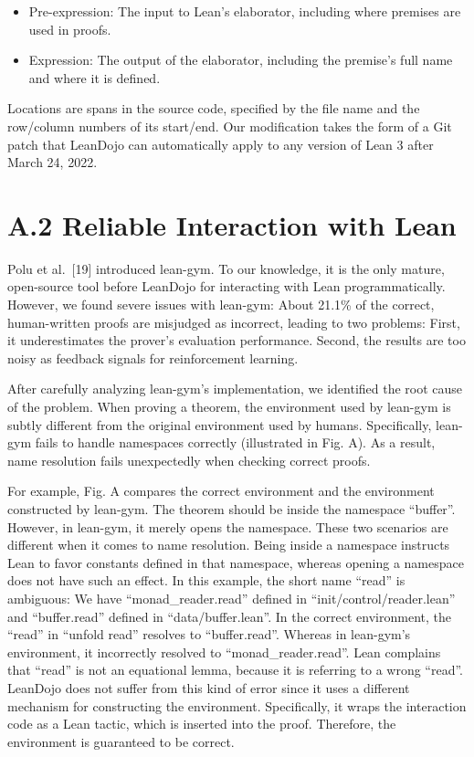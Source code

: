 \documentclass[
]{article}
\providecommand{\tightlist}{%
  \setlength{\itemsep}{0pt}\setlength{\parskip}{0pt}}
\begin{document}
\begin{itemize}
\tightlist
\item
  Pre-expression: The input to Lean's elaborator, including where
  premises are used in proofs.\\
\item
  Expression: The output of the elaborator, including the premise's full
  name and where it is defined.
\end{itemize}

Locations are spans in the source code, specified by the file name and
the row/column numbers of its start/end. Our modification takes the form
of a Git patch that LeanDojo can automatically apply to any version of
Lean 3 after March 24, 2022.

\section{A.2 Reliable Interaction with
Lean}\label{a.2-reliable-interaction-with-lean}

Polu et al.~{[}19{]} introduced lean-gym. To our knowledge, it is the
only mature, open-source tool before LeanDojo for interacting with Lean
programmatically. However, we found severe issues with lean-gym: About
21.1\% of the correct, human-written proofs are misjudged as incorrect,
leading to two problems: First, it underestimates the prover's
evaluation performance. Second, the results are too noisy as feedback
signals for reinforcement learning.

After carefully analyzing lean-gym's implementation, we identified the
root cause of the problem. When proving a theorem, the environment used
by lean-gym is subtly different from the original environment used by
humans. Specifically, lean-gym fails to handle namespaces correctly
(illustrated in Fig. A). As a result, name resolution fails unexpectedly
when checking correct proofs.

For example, Fig. A compares the correct environment and the environment
constructed by lean-gym. The theorem should be inside the namespace
``buffer''. However, in lean-gym, it merely opens the namespace. These
two scenarios are different when it comes to name resolution. Being
inside a namespace instructs Lean to favor constants defined in that
namespace, whereas opening a namespace does not have such an effect. In
this example, the short name ``read'' is ambiguous: We have
``monad\_reader.read'' defined in ``init/control/reader.lean'' and
``buffer.read'' defined in ``data/buffer.lean''. In the correct
environment, the ``read'' in ``unfold read'' resolves to
``buffer.read''. Whereas in lean-gym's environment, it incorrectly
resolved to ``monad\_reader.read''. Lean complains that ``read'' is not
an equational lemma, because it is referring to a wrong ``read''.
LeanDojo does not suffer from this kind of error since it uses a
different mechanism for constructing the environment. Specifically, it
wraps the interaction code as a Lean tactic, which is inserted into the
proof. Therefore, the environment is guaranteed to be correct.
\end{document}
